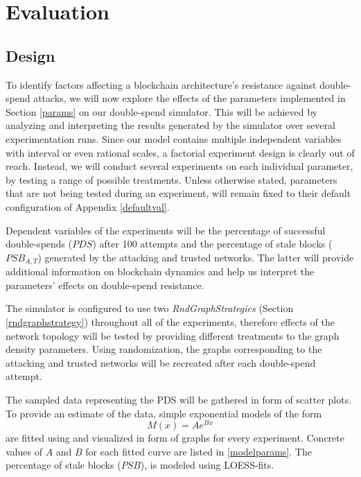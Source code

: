 \documentclass[a4paper,12pt,twoside]{report}
\begin{document}
\chapter{Evaluation}

\section{Design} \label{design}
To identify factors affecting a blockchain architecture's resistance against double-spend attacks, we will now explore the effects of the parameters implemented in Section \ref{params} on our double-spend simulator. This will be achieved by analyzing and interpreting the results generated by the simulator over several experimentation runs. Since our model contains multiple independent variables with interval or even rational scales, a factorial experiment design is clearly out of reach. Instead, we will conduct several experiments on each individual parameter, by testing a range of possible treatments. Unless otherwise stated, parameters that are not being tested during an experiment, will remain fixed to their default configuration of Appendix \ref{defaultval}. 

Dependent variables of the experiments will be the percentage of successful double-spends ($PDS$) after 100 attempts and the percentage of stale blocks ($PSB_{A,T}$) generated by the attacking and trusted networks. The latter will provide additional information on blockchain dynamics and help us interpret the parameters' effects on double-spend resistance. 

The simulator is configured to use two \textit{RndGraphStrategies} (Section \ref{rndgraphstrategy}) throughout all of the experiments, therefore effects of the network topology will be tested by providing different treatments to the graph density parameters. Using randomization, the graphs corresponding to the attacking and trusted networks will be recreated after each double-spend attempt. 

The sampled data representing the PDS will be gathered in form of scatter plots. To provide an estimate of the data, simple exponential models of the form
\begin{equation}\label{model}
M(x) = Ae^{Bx}
\end{equation}
are fitted using \cite{nlxb} and visualized in form of graphs for every experiment. Concrete values of $A$ and $B$ for each fitted curve are listed in \autoref{modelparams}. The percentage of stale blocks ($PSB$), is modeled using LOESS-fits. 
\end{document}

